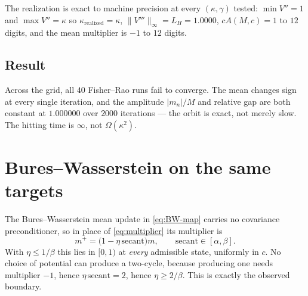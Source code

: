 \documentclass[11pt]{article}
\begin{document}
The realization is exact to machine precision at every $(\kappa,\gamma)$ tested:
$\min V''=1$ and $\max V''=\kappa$ so $\kappa_{\mathrm{realized}}=\kappa$,
$\|V'''\|_\infty=L_H=1.0000$, $cA(M,c)=1$ to $12$ digits, and the mean multiplier is
$-1$ to $12$ digits.

\subsection{Result}

\begin{table}[t]
\centering

\caption{Both Fisher--Rao schemes cycle forever at every fixed order-one $\gamma$
tested; the Bures--Wasserstein step converges on the \emph{same} target at its
certified $\eta=1/\beta$. The last column confirms the Hessian-Lipschitz budget is
respected, so the targets are admissible under the manuscript's additional smoothness
assumption.}
\label{tab:two-cycle}
\end{table}

Across the grid, all $40$ Fisher--Rao runs fail to converge. The mean changes sign at
every single iteration, and the amplitude $|m_n|/M$ and relative gap are both
constant at $1.000000$ over $2000$ iterations --- the orbit is exact, not merely
slow. The hitting time is $\infty$, not $\Omega(\kappa^2)$.

\begin{table}[t]
\centering

\caption{Robustness of the orbit: the initial mean is scaled by $1+\varepsilon$.
Every run still cycles out to $\varepsilon=10^{-2}$, so the counterexample is not a
measure-zero knife edge. Larger perturbations eventually escape, but only after
excursions to several times the initial gap.}
\label{tab:basin}
\end{table}

\section{Bures--Wasserstein on the same targets}
\label{sec:bw}

The Bures--Wasserstein mean update in \eqref{eq:BW-map} carries no covariance
preconditioner, so in place of \eqref{eq:multiplier} its multiplier is
\begin{equation}\label{eq:bw-multiplier}
    m^+=\bigl(1-\eta\,\text{secant}\bigr)m,
    \qquad \text{secant}\in[\alpha,\beta].
\end{equation}
With $\eta\le1/\beta$ this lies in $[0,1)$ at \emph{every} admissible state,
uniformly in $c$. No choice of potential can produce a two-cycle, because producing
one needs multiplier $-1$, hence $\eta\,\text{secant}=2$, hence
$\eta\ge2/\beta$. This is exactly the observed boundary.
\end{document}
